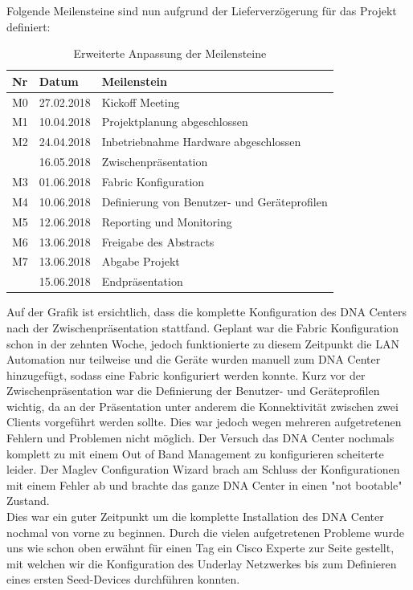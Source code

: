 Folgende Meilensteine sind nun aufgrund der Lieferverzögerung für das Projekt definiert:
\begin{table}[H]
	\centering
	\begin{tabularx}{\textwidth}{p{1cm}| p{2.5cm}| X}
		\rowcolor{gray!50}
		\textbf{Nr} & \textbf{Datum} & \textbf{Meilenstein} \\
		\hline	
		M0 & 27.02.2018 & Kickoff Meeting \\
		M1 & 10.04.2018 & Projektplanung abgeschlossen \\
		M2 & 24.04.2018 & Inbetriebnahme Hardware abgeschlossen \\
		   & 16.05.2018 & Zwischenpräsentation \\
		M3 & 01.06.2018 & Fabric Konfiguration \\
		M4 & 10.06.2018 & Definierung von Benutzer- und Geräteprofilen \\
		M5 & 12.06.2018 & Reporting und Monitoring \\
		M6 & 13.06.2018 & Freigabe des Abstracts \\
		M7 & 13.06.2018 & Abgabe Projekt \\
		   & 15.06.2018 & Endpräsentation \\
	\end{tabularx}
	\caption{Erweiterte Anpassung der Meilensteine}
	\label{tab:Erweiterte Anpassung der Meilensteine}
\end{table}

Auf der Grafik ist ersichtlich, dass die komplette Konfiguration des DNA Centers nach der Zwischenpräsentation stattfand. Geplant war die Fabric Konfiguration schon in der zehnten Woche, jedoch funktionierte zu diesem Zeitpunkt die LAN Automation nur teilweise und die Geräte wurden manuell zum DNA Center hinzugefügt, sodass eine Fabric konfiguriert werden konnte. Kurz vor der Zwischenpräsentation war die Definierung der Benutzer- und Geräteprofilen wichtig, da an der Präsentation unter anderem die Konnektivität zwischen zwei Clients vorgeführt werden sollte. Dies war jedoch wegen mehreren aufgetretenen Fehlern und Problemen nicht möglich. Der Versuch das DNA Center nochmals komplett zu mit einem Out of Band Management zu konfigurieren scheiterte leider. Der Maglev Configuration Wizard brach am Schluss der Konfigurationen mit einem Fehler ab und brachte das ganze DNA Center in einen "not bootable" Zustand. \\
Dies war ein guter Zeitpunkt um die komplette Installation des DNA Center nochmal von vorne zu beginnen. Durch die vielen aufgetretenen Probleme wurde uns wie schon oben erwähnt für einen Tag ein Cisco Experte zur Seite gestellt, mit welchen wir die Konfiguration des Underlay Netzwerkes bis zum Definieren eines ersten Seed-Devices durchführen konnten.




